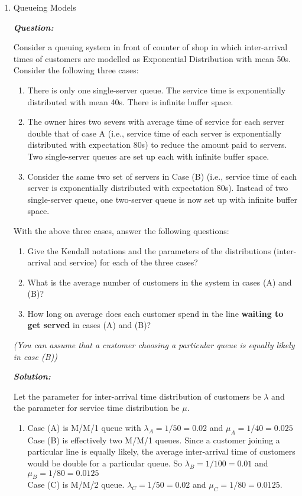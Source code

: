 \documentclass[12pt, oneside]{article}
\begin{document}
\begin{enumerate}
\newpage
\item Queueing Models

\textbf{\textit{Question:}}

Consider a queuing system in front of counter of shop in which inter-arrival times of customers are modelled as Exponential Distribution with mean 50s. Consider the following three cases:
\begin{enumerate}[label=(\Alph*)]
    \item There is only one single-server queue. The service time is exponentially distributed with mean 40s. There is infinite buffer space.
    \item The owner hires two severs with average time of service for each server double that of case A (i.e., service time of each server is exponentially distributed with expectation 80s) to reduce the amount paid to servers. Two single-server queues are set up each with infinite buffer space.
    \item Consider the same two set of servers in Case (B) (i.e., service time of each server is exponentially distributed with expectation 80s). Instead of two single-server queue, one two-server queue is now set up with infinite buffer space.
\end{enumerate}
With the above three cases, answer the following questions:
\begin{enumerate}[label=(\roman*)]
\item Give the Kendall notations and the parameters of the distributions (inter-arrival and service) for each of the three cases?
\item What is the average number of customers in the system in cases (A) and (B)?
\item How long on average does each customer spend in the line \textbf{waiting to get served} in cases (A) and (B)?
\end{enumerate}
\textit{(You can assume that a customer choosing a particular queue is equally likely in case (B))}



\textbf{\textit{Solution:}}

Let the parameter for inter-arrival time distribution of customers be $\lambda$ and the parameter for service time distribution be $\mu$.

\begin{enumerate}[label=(\roman*)]
\item   
        Case (A) is M/M/1 queue with $\lambda_A = 1/50 = 0.02$ and $\mu_A = 1/40 = 0.025$ \\
        Case (B) is effectively two M/M/1 queues. Since a customer joining a particular line is equally likely, the average inter-arrival time of customers would be double for a particular queue. So $\lambda_B = 1/100 = 0.01$ and $\mu_B = 1/80 = 0.0125$ \\
        Case (C) is M/M/2 queue. $\lambda_C = 1/50 = 0.02$ and $\mu_C = 1/80 = 0.0125$.


\end{enumerate}
\end{enumerate}
\end{document}

